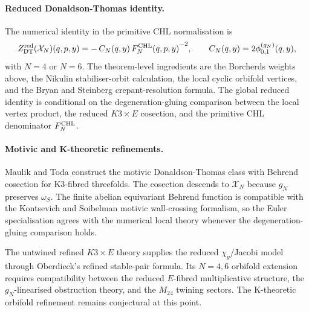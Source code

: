 \paragraph{Reduced Donaldson-Thomas identity.}
The numerical identity in the primitive CHL normalisation is
\[
Z^{\mathrm{red}}_{\mathrm{DT}}(\mathcal X_N)(q,p,y)
=-\,C_N(q,y)\,{F^{\mathrm{CHL}}_N(q,p,y)}^{-2},
\qquad
C_N(q,y)=2\phi^{(g_N)}_{0,1}(q,y),
\]
with \(N=4\) or \(N=6\). The theorem-level ingredients are the
Borcherds weights above, the Nikulin stabiliser-orbit calculation, the
local cyclic orbifold vertices, and the Bryan and Steinberg
crepant-resolution formula. The global reduced identity is conditional
on the degeneration-gluing comparison between the local vertex product,
the reduced \(K3\times E\) cosection, and the primitive CHL denominator
\(F^{\mathrm{CHL}}_N\).

\paragraph{Motivic and K-theoretic refinements.}
Maulik and Toda construct the motivic Donaldson-Thomas class with
Behrend cosection for K3-fibred threefolds. The cosection descends to
\(\mathcal X_N\) because \(g_N\) preserves \(\omega_S\). The finite
abelian equivariant Behrend function is compatible with the
Kontsevich and Soibelman motivic wall-crossing formalism, so the
Euler specialisation agrees with the numerical local theory whenever
the degeneration-gluing comparison holds.

The untwined refined \(K3\times E\) theory supplies the reduced
\(\chi_y\)/Jacobi model through Oberdieck's refined stable-pair
formula. Its \(N=4,6\) orbifold extension requires compatibility
between the reduced \(E\)-fibred multiplicative structure, the
\(g_N\)-linearised obstruction theory, and the \(M_{24}\) twining
sectors. The K-theoretic orbifold refinement remains conjectural at
this point.

